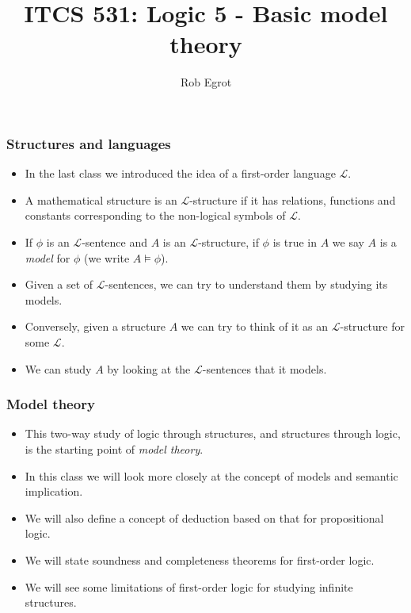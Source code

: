 \documentclass[handout]{beamer}
\title{ITCS 531: Logic 5 - Basic model theory}
\date{}
\author{Rob Egrot}
\newcommand{\sL}{\mathscr{L}}
\begin{document}
\begin{frame}
\titlepage
\end{frame}

\begin{frame}
\frametitle{Structures and languages}
\begin{itemize}
\item In the last class we introduced the idea of a first-order language $\sL$.
\vspace{0.2cm}
\item A mathematical structure is an $\sL$-structure if it has relations, functions and constants corresponding to the non-logical symbols of $\sL$.
\vspace{0.2cm}
\item If $\phi$ is an $\sL$-sentence and $A$ is an $\sL$-structure, if $\phi$ is true in $A$ we say $A$ is a \emph{model} for $\phi$ (we write $A\models \phi$).
\vspace{0.2cm}
\item Given a set of $\sL$-sentences, we can try to understand them by studying its models.
\vspace{0.2cm}
\item Conversely, given a structure $A$ we can try to think of it as an $\sL$-structure for some $\sL$. 
\vspace{0.2cm}
\item We can study $A$ by looking at the $\sL$-sentences that it models.
\end{itemize}
\end{frame}

\begin{frame}
\frametitle{Model theory}
\begin{itemize}
\item This two-way study of logic through structures, and structures through logic, is the starting point of \emph{model theory}.
\vspace{0.4cm}
\item In this class we will look more closely at the concept of models and semantic implication.
\vspace{0.4cm}
\item We will also define a concept of deduction based on that for propositional logic.
\vspace{0.4cm}
\item We will state soundness and completeness theorems for first-order logic.
\vspace{0.4cm}
\item We will see some limitations of first-order logic for studying infinite structures. 
\end{itemize}
\end{frame}
\end{document}
